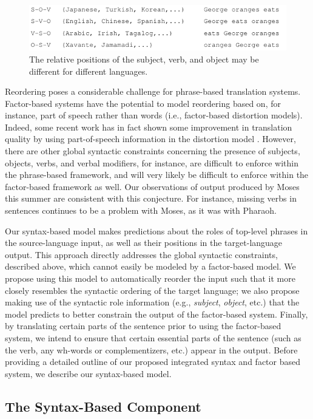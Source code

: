 \documentclass[10pt]{report}
\theoremstyle{plain}
\begin{document}
{\begin{figure}
\centering
\includegraphics[scale=1]{brooke-basicorder}
\caption{The relative positions of the subject, verb, and object may
be different for different languages.}
\label{basicorder}
\end{figure}

Reordering poses a considerable challenge for phrase-based translation
systems. Factor-based systems have the potential to model reordering
based on, for instance, part of speech rather than words (i.e.,
factor-based distortion models). Indeed, some recent work has in fact
shown some improvement in translation quality by using part-of-speech
information in the distortion model . However, there are
other global syntactic constraints concerning the presence of
subjects, objects, verbs, and verbal modifiers, for instance, are
difficult to enforce within the phrase-based framework, and will very
likely be difficult to enforce within the factor-based framework as
well. Our observations of output produced by Moses this summer are
consistent with this conjecture. For instance, missing verbs in
sentences continues to be a problem with Moses, as it was with
Pharaoh.

Our syntax-based model makes predictions about the roles of top-level
phrases in the source-language input, as well as their positions in
the target-language output. This approach directly addresses the
global syntactic constraints, described above, which cannot easily be
modeled by a factor-based model. We propose using this model to
automatically reorder the input such that it more closely resembles
the syntactic ordering of the target language; we also propose making
use of the syntactic role information (e.g., {\em subject}, {\em
object}, etc.) that the model predicts to better constrain the output
of the factor-based system. Finally, by translating certain parts of
the sentence prior to using the factor-based system, we intend to
ensure that certain essential parts of the sentence (such as the verb,
any wh-words or complementizers, etc.) appear in the output. Before
providing a detailed outline of our proposed integrated syntax and
factor based system, we describe our syntax-based model.

\subsection{The Syntax-Based Component}
\label{framework}

}
\end{document}
